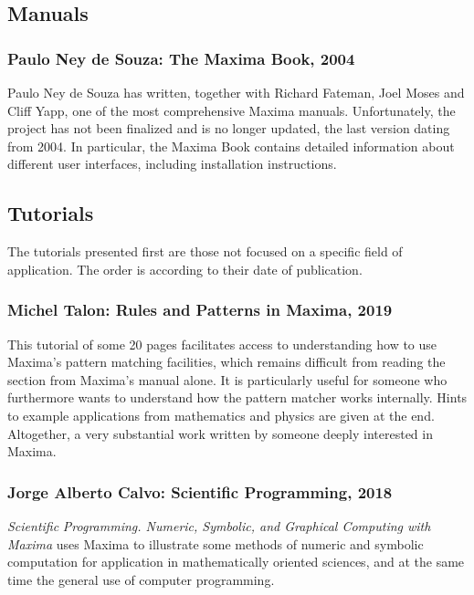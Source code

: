 \documentclass[../Maxima_Workbook.tex]{subfiles}
\begin{document}
\subsection{Manuals}

\subsubsection{Paulo Ney de Souza: The Maxima Book, 2004}

Paulo Ney de Souza has written, together with Richard Fateman, Joel Moses and Cliff Yapp, one of the most comprehensive Maxima manuals. Unfortunately, the project has not been finalized and is no longer updated, the last version dating from 2004. In particular, the Maxima Book contains detailed information about different user interfaces, including installation instructions.

\subsection{Tutorials}

The tutorials presented first are those not focused on a specific field of application. The order is according to their date of publication.

\subsubsection{Michel Talon: Rules and Patterns in Maxima, 2019}

This tutorial of some 20 pages facilitates access to understanding how to use Maxima's pattern matching facilities, which remains difficult from reading the section from Maxima's manual alone. It is particularly useful for someone who furthermore wants to understand how the pattern matcher works internally. Hints to example applications from mathematics and physics are given at the end. Altogether, a very substantial work written by someone deeply interested in Maxima.

\subsubsection{Jorge Alberto Calvo: Scientific Programming, 2018}

\emph{Scientific} \emph{Programming. Numeric, Symbolic, and Graphical Computing with Maxima} uses Maxima to illustrate some methods of numeric and symbolic computation for application in mathematically oriented sciences, and at the same time the general use of computer programming.
\end{document}
